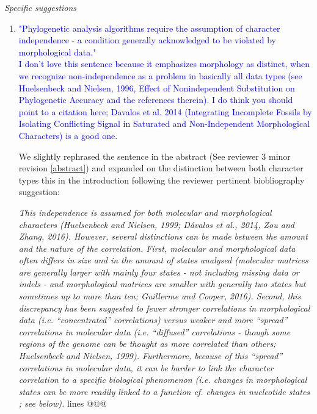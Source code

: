 \documentclass[12pt,letterpaper]{article}
\renewcommand{\subsection}[1]{%
\bigskip
\begin{center}
\begin{large}
\normalfont\itshape #1
\end{large}
\end{center}}
\begin{document}
\subsection{Specific suggestions}

\begin{enumerate}

\item{\textcolor{blue}{"Phylogenetic analysis algorithms require the assumption of character independence - a condition generally acknowledged to be violated by morphological data."\\
I don't love this sentence because it emphasizes morphology as distinct, when we recognize non-independence as a problem in basically all data types (see Huelsenbeck and Nielsen, 1996, Effect of Nonindependent Substitution on Phylogenetic Accuracy and the references therein). I do think you should point to a citation here; Davalos et al. 2014 (Integrating Incomplete Fossils by Isolating Conflicting Signal in Saturated and Non-Independent Morphological Characters) is a good one.}}
\label{molecular}

We slightly rephrased the sentence in the abstract (See reviewer 3 minor revision \ref{abstract}) and expanded on the distinction between both character types this in the introduction following the reviewer pertinent biobliography suggestion:

\textit{This independence is assumed for both molecular and morphological characters (Huelsenbeck and Nielsen, 1999; D\'{a}valos et al., 2014, Zou and Zhang, 2016).
However, several distinctions can be made between the amount and the nature of the correlation.
First, molecular and morphological data often differs in size and in the amount of states analysed (molecular matrices are generally larger with mainly four states - not including missing data or indels - and morphological matrices are smaller with generally two states but sometimes up to more than ten; Guillerme and Cooper, 2016).
Second, this discrepancy has been suggested to fewer stronger correlations in morphological data (i.e. ``concentrated'' correlations) versus weaker and more ``spread'' correlations in molecular data (i.e. ``diffused'' correlations - though some regions of the genome can be thought as more correlated than others; Huelsenbeck and Nielsen, 1999).
Furthermore, because of this ``spread'' correlations in molecular data, it can be harder to link the character correlation to a specific biological phenomenon (i.e. changes in morphological states can be more readily linked to a function cf. changes in nucleotide states ; see below).} lines @@@


\end{enumerate}
\end{document}
